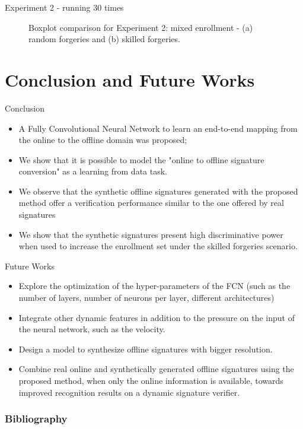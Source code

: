 \documentclass{beamer}
\begin{document}
\begin{frame}{Experiment 2 - running 30 times}
\begin{figure}[!htb]
\caption{Boxplot comparison for Experiment 2: mixed enrollment - (a) random forgeries and (b) skilled forgeries. } \label{fig:boxexp2}
\end{figure}
\end{frame}



\section{Conclusion and Future Works}
\begin{frame}{Conclusion}
\begin{itemize}
\item A Fully Convolutional Neural Network to learn an end-to-end mapping from the online to the offline domain was proposed;
\item We show that it is possible to model the "online to offline signature conversion" as a learning from data task.
\item We observe that the synthetic offline signatures generated with the proposed method offer a verification performance similar to the one offered by real signatures 
\item We show that the synthetic signatures present high discriminative power when used to increase the enrollment set under the skilled forgeries scenario.
\end{itemize}
\end{frame}


\begin{frame}{Future Works}
\begin{itemize}
\item Explore the optimization of the hyper-parameters of the FCN
(such as the number of layers, number of neurons per layer, different architectures)
\item Integrate other dynamic features in addition to the pressure on the input of the neural network, such as the velocity.
\item Design a model to synthesize offline signatures with bigger resolution.

\item Combine real online and synthetically generated offline signatures using the
proposed method, when only the online information is available, towards improved
recognition results on a dynamic signature verifier.

\end{itemize}
\end{frame}

\begin{frame}[allowframebreaks]
\frametitle{Bibliography}
\printbibliography

\end{frame}
\end{document}
